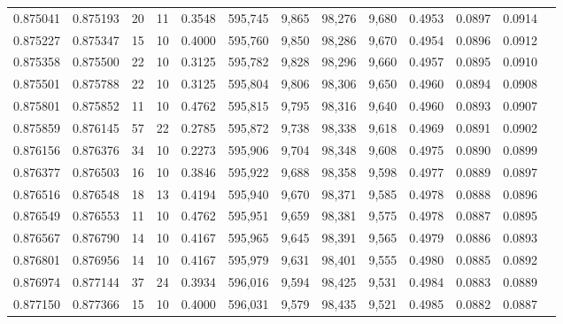 \begin{tabular}{rrrrrrrrrrrrr}
0.875041 & 0.875193 &    20 &  11 &                                     0.3548 & 595,745 &   9,865 &  98,276 &   9,680 & 0.4953 & 0.0897 & 0.0914 \\
0.875227 & 0.875347 &    15 &  10 &                                     0.4000 & 595,760 &   9,850 &  98,286 &   9,670 & 0.4954 & 0.0896 & 0.0912 \\
0.875358 & 0.875500 &    22 &  10 &                                     0.3125 & 595,782 &   9,828 &  98,296 &   9,660 & 0.4957 & 0.0895 & 0.0910 \\
0.875501 & 0.875788 &    22 &  10 &                                     0.3125 & 595,804 &   9,806 &  98,306 &   9,650 & 0.4960 & 0.0894 & 0.0908 \\
0.875801 & 0.875852 &    11 &  10 &                                     0.4762 & 595,815 &   9,795 &  98,316 &   9,640 & 0.4960 & 0.0893 & 0.0907 \\
0.875859 & 0.876145 &    57 &  22 &                                     0.2785 & 595,872 &   9,738 &  98,338 &   9,618 & 0.4969 & 0.0891 & 0.0902 \\
0.876156 & 0.876376 &    34 &  10 &                                     0.2273 & 595,906 &   9,704 &  98,348 &   9,608 & 0.4975 & 0.0890 & 0.0899 \\
0.876377 & 0.876503 &    16 &  10 &                                     0.3846 & 595,922 &   9,688 &  98,358 &   9,598 & 0.4977 & 0.0889 & 0.0897 \\
0.876516 & 0.876548 &    18 &  13 &                                     0.4194 & 595,940 &   9,670 &  98,371 &   9,585 & 0.4978 & 0.0888 & 0.0896 \\
0.876549 & 0.876553 &    11 &  10 &                                     0.4762 & 595,951 &   9,659 &  98,381 &   9,575 & 0.4978 & 0.0887 & 0.0895 \\
0.876567 & 0.876790 &    14 &  10 &                                     0.4167 & 595,965 &   9,645 &  98,391 &   9,565 & 0.4979 & 0.0886 & 0.0893 \\
0.876801 & 0.876956 &    14 &  10 &                                     0.4167 & 595,979 &   9,631 &  98,401 &   9,555 & 0.4980 & 0.0885 & 0.0892 \\
0.876974 & 0.877144 &    37 &  24 &                                     0.3934 & 596,016 &   9,594 &  98,425 &   9,531 & 0.4984 & 0.0883 & 0.0889 \\
0.877150 & 0.877366 &    15 &  10 &                                     0.4000 & 596,031 &   9,579 &  98,435 &   9,521 & 0.4985 & 0.0882 & 0.0887 \\

\end{tabular}
